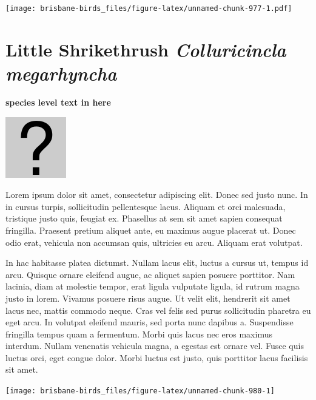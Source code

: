 \documentclass[]{book}
\let\origfigure\figure
\let\endorigfigure\endfigure
\renewenvironment{figure}[1][2] {
  \expandafter\origfigure\expandafter[H]
} {
  \endorigfigure
}
\begin{document}
\begin{figure}
\centering
\texttt{[image: brisbane-birds\_files/figure-latex/unnamed-chunk-977-1.pdf]}
\caption{\label{fig:unnamed-chunk-977}insert figure caption}
\end{figure}

\section{\texorpdfstring{Little Shrikethrush \emph{Colluricincla
megarhyncha}}{Little Shrikethrush Colluricincla megarhyncha}}\label{little-shrikethrush-colluricincla-megarhyncha}

\textbf{species level text in here}

\begin{figure}
\centering
\includegraphics{assets/missing.png}
\caption{No image for species}
\end{figure}

Lorem ipsum dolor sit amet, consectetur adipiscing elit. Donec sed justo
nunc. In in cursus turpis, sollicitudin pellentesque lacus. Aliquam et
orci malesuada, tristique justo quis, feugiat ex. Phasellus at sem sit
amet sapien consequat fringilla. Praesent pretium aliquet ante, eu
maximus augue placerat ut. Donec odio erat, vehicula non accumsan quis,
ultricies eu arcu. Aliquam erat volutpat.

In hac habitasse platea dictumst. Nullam lacus elit, luctus a cursus ut,
tempus id arcu. Quisque ornare eleifend augue, ac aliquet sapien posuere
porttitor. Nam lacinia, diam at molestie tempor, erat ligula vulputate
ligula, id rutrum magna justo in lorem. Vivamus posuere risus augue. Ut
velit elit, hendrerit sit amet lacus nec, mattis commodo neque. Cras vel
felis sed purus sollicitudin pharetra eu eget arcu. In volutpat eleifend
mauris, sed porta nunc dapibus a. Suspendisse fringilla tempus quam a
fermentum. Morbi quis lacus nec eros maximus interdum. Nullam venenatis
vehicula magna, a egestas est ornare vel. Fusce quis luctus orci, eget
congue dolor. Morbi luctus est justo, quis porttitor lacus facilisis sit
amet.

\begin{figure}
\texttt{[image: brisbane-birds\_files/figure-latex/unnamed-chunk-980-1]} \caption{insert figure caption}\label{fig:unnamed-chunk-980}
\end{figure}
\end{document}
